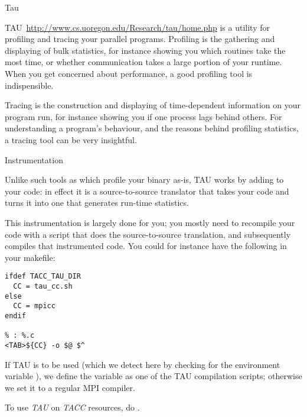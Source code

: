 
 {Tau}
\label{sec:tau}


TAU~\url{http://www.cs.uoregon.edu/Research/tau/home.php} is a utility
for profiling and tracing your parallel programs. Profiling is the
gathering and displaying of bulk statistics, for instance showing you
which routines take the most time, or whether communication takes a
large portion of your runtime. When you get concerned about
performance, a good profiling tool is indispensible.

Tracing is the construction and displaying of time-dependent
information on  your program run, for instance showing you if one
process lags behind others. For understanding a program's behaviour,
and the reasons behind profiling statistics, a tracing tool can be
very insightful.

 {Instrumentation}

Unlike such tools as  which profile your binary as-is,
TAU works by adding  to your code: in
effect it is a source-to-source translator that takes your code and
turns it into one that generates run-time statistics.

This instrumentation is largely done for you; you mostly need to recompile
your code with a script that does the source-to-source translation,
and subsequently compiles that instrumented code.
You could for instance have the following in your makefile:
\begin{verbatim}
ifdef TACC_TAU_DIR
  CC = tau_cc.sh
else
  CC = mpicc
endif

% : %.c
<TAB>${CC} -o $@ $^
\end{verbatim}
If TAU is to be used (which we detect here by checking for the environment variable
), we define the  variable as
one of the TAU compilation scripts; otherwise we set it to a regular MPI compiler.

\begin{istc}
To use \emph{TAU} on \emph{TACC} resources,
do .
\end{istc}

